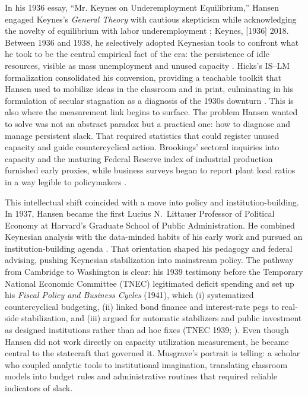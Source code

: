 \documentclass[11pt]{article}
\begin{document}
In his 1936 essay, ``Mr. Keynes on Underemployment Equilibrium,'' Hansen engaged Keynes's \emph{General Theory} with cautious skepticism while acknowledging the novelty of equilibrium with labor underemployment \citep{hansen1936}; Keynes, [1936] 2018. Between 1936 and 1938, he selectively adopted Keynesian tools to confront what he took to be the central empirical fact of the era: the persistence of idle resources, visible as mass unemployment and unused capacity \citep{barber1987}. Hicks's IS--LM formalization consolidated his conversion, providing a teachable toolkit that Hansen used to mobilize ideas in the classroom and in print, culminating in his formulation of secular stagnation as a diagnosis of the 1930s downturn \citep{hicks1937}. This is also where the measurement link begins to surface. The problem Hansen wanted to solve was not an abstract paradox but a practical one: how to diagnose and manage persistent slack. That required statistics that could register unused capacity and guide countercyclical action. Brookings' sectoral inquiries into capacity and the maturing Federal Reserve index of industrial production furnished early proxies, while business surveys began to report plant load ratios in a way legible to policymakers \citep{barber1987}.

This intellectual shift coincided with a move into policy and institution-building. In 1937, Hansen became the first Lucius N.\ Littauer Professor of Political Economy at Harvard's Graduate School of Public Administration. He combined Keynesian analysis with the data-minded habits of his early work and pursued an institution-building agenda \citep{musgrave1976}. That orientation shaped his pedagogy and federal advising, pushing Keynesian stabilization into mainstream policy. The pathway from Cambridge to Washington is clear: his 1939 testimony before the Temporary National Economic Committee (TNEC) legitimated deficit spending and set up his \emph{Fiscal Policy and Business Cycles} (1941), which (i) systematized countercyclical budgeting, (ii) linked bond finance and interest-rate pegs to real-side stabilization, and (iii) argued for automatic stabilizers and public investment as designed institutions rather than ad hoc fixes (TNEC 1939; \citealp{hansen1941}). Even though Hansen did not work directly on capacity utilization measurement, he became central to the statecraft that governed it. Musgrave's \citeyearpar{musgrave1976} portrait is telling: a scholar who coupled analytic tools to institutional imagination, translating classroom models into budget rules and administrative routines that required reliable indicators of slack.
\end{document}
